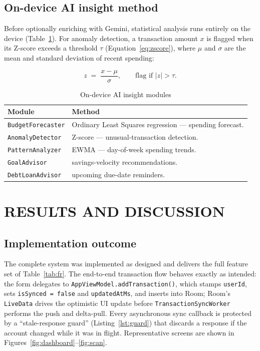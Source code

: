 \documentclass[13pt,a4paper]{extarticle}
\begin{document}
\subsection{On-device AI insight method}
Before optionally enriching with Gemini, statistical analysis runs entirely on the device
(Table~\ref{tab:insight}). For anomaly detection, a transaction amount $x$ is flagged when its
Z-score exceeds a threshold $\tau$ (Equation~\ref{eq:zscore}), where $\mu$ and $\sigma$ are the mean
and standard deviation of recent spending:

\begin{equation}
\label{eq:zscore}
z \;=\; \frac{x - \mu}{\sigma}, \qquad \text{flag if } |z| > \tau .
\end{equation}

\begin{table}[H]
\centering
\caption{On-device AI insight modules}
\label{tab:insight}
\renewcommand{\arraystretch}{1.2}
\begin{tabularx}{\textwidth}{@{}l X@{}}
\toprule
\textbf{Module} & \textbf{Method} \\
\midrule
\texttt{BudgetForecaster} & Ordinary Least Squares regression --- spending forecast. \\
\texttt{AnomalyDetector}  & Z-score --- unusual-transaction detection. \\
\texttt{PatternAnalyzer}  & EWMA --- day-of-week spending trends. \\
\texttt{GoalAdvisor}      & savings-velocity recommendations. \\
\texttt{DebtLoanAdvisor}  & upcoming due-date reminders. \\
\bottomrule
\end{tabularx}
\end{table}

\section{RESULTS AND DISCUSSION}

\subsection{Implementation outcome}
The complete system was implemented as designed and delivers the full feature set of
Table~\ref{tab:fr}. The end-to-end transaction flow behaves exactly as intended: the form delegates
to \texttt{AppViewModel.addTransaction()}, which stamps \texttt{userId}, sets \texttt{isSynced =
false} and \texttt{updatedAtMs}, and inserts into Room; Room's \texttt{LiveData} drives the
optimistic UI update before \texttt{TransactionSyncWorker} performs the push and delta-pull. Every
asynchronous sync callback is protected by a ``stale-response guard'' (Listing~\ref{lst:guard}) that
discards a response if the account changed while it was in flight. Representative screens are shown
in Figures~\ref{fig:dashboard}--\ref{fig:scan}.
\end{document}

